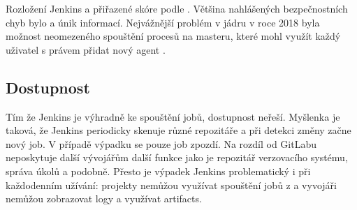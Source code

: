         \begin{iffigure}
            \centering
            \caption{Rozložení Jenkins  a přiřazené skóre podle . Většina nahlášených bezpečnostních chyb bylo  a únik informací. Nejvážnější problém v jádru v roce 2018 byla možnost neomezeného spouštění procesů na masteru, které mohl využít každý uživatel s právem přidat nový agent \cite{cve-jenkins}.}
            \label{fig:gitlab-review-cycle}
        \end{iffigure}

    \subsection{Dostupnost}
        Tím že Jenkins je výhradně ke spouštění jobů, dostupnost neřeší. Myšlenka je taková, že Jenkins periodicky skenuje různé repozitáře a při detekci změny začne nový job. V případě výpadku se pouze job zpozdí. Na rozdíl od GitLabu neposkytuje další vývojářům další funkce jako je repozitář verzovacího systému, správa úkolů a podobně. Přesto je výpadek Jenkins problematický i při každodenním užívání: projekty nemůžou využívat spouštění jobů z  a vyvojáři nemůžou zobrazovat logy a využívat artifacts.

